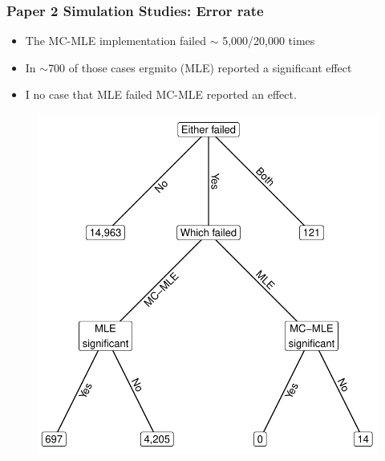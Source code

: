 \documentclass[aspectratio=169, 9pt]{beamer}\usepackage[]{graphicx}\usepackage[]{color}
\begin{document}
\begin{frame}[label=ergmsims,allowframebreaks]
\frametitle{Paper 2 Simulation Studies: Error rate}

\begin{minipage}{.45\linewidth}
\begin{itemize}[<+->]
\item The MC-MLE implementation failed $\sim$ 5,000/20,000 times
\item In $\sim$700 of those cases ergmito (MLE) reported a significant effect
\item I no case that MLE failed MC-MLE reported an effect.
\end{itemize}
\end{minipage}
\hfill
\begin{minipage}{.45\linewidth}
\begin{figure}
\centering
\includegraphics[width=.9\linewidth]{failed-tree.pdf}
\end{figure}
\end{minipage}


\end{frame}
\end{document}
